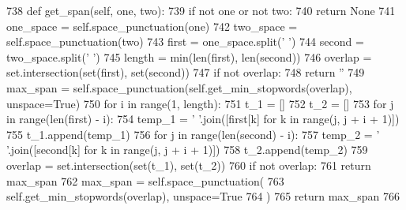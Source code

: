 \begin{DoxyCode}
738     \textcolor{keyword}{def }get\_span(self, one, two):
739         \textcolor{keywordflow}{if} \textcolor{keywordflow}{not} one \textcolor{keywordflow}{or} \textcolor{keywordflow}{not} two:
740             \textcolor{keywordflow}{return} \textcolor{keywordtype}{None}
741         one\_space = self.space\_punctuation(one)
742         two\_space = self.space\_punctuation(two)
743         first = one\_space.split(\textcolor{stringliteral}{' '})
744         second = two\_space.split(\textcolor{stringliteral}{' '})
745         length = min(len(first), len(second))
746         overlap = set.intersection(set(first), set(second))
747         \textcolor{keywordflow}{if} \textcolor{keywordflow}{not} overlap:
748             \textcolor{keywordflow}{return} \textcolor{stringliteral}{''}
749         max\_span = self.space\_punctuation(self.get\_min\_stopwords(overlap), unspace=\textcolor{keyword}{True})
750         \textcolor{keywordflow}{for} i \textcolor{keywordflow}{in} range(1, length):
751             t\_1 = []
752             t\_2 = []
753             \textcolor{keywordflow}{for} j \textcolor{keywordflow}{in} range(len(first) - i):
754                 temp\_1 = \textcolor{stringliteral}{' '}.join([first[k] \textcolor{keywordflow}{for} k \textcolor{keywordflow}{in} range(j, j + i + 1)])
755                 t\_1.append(temp\_1)
756             \textcolor{keywordflow}{for} j \textcolor{keywordflow}{in} range(len(second) - i):
757                 temp\_2 = \textcolor{stringliteral}{' '}.join([second[k] \textcolor{keywordflow}{for} k \textcolor{keywordflow}{in} range(j, j + i + 1)])
758                 t\_2.append(temp\_2)
759             overlap = set.intersection(set(t\_1), set(t\_2))
760             \textcolor{keywordflow}{if} \textcolor{keywordflow}{not} overlap:
761                 \textcolor{keywordflow}{return} max\_span
762             max\_span = self.space\_punctuation(
763                 self.get\_min\_stopwords(overlap), unspace=\textcolor{keyword}{True}
764             )
765         \textcolor{keywordflow}{return} max\_span
766 
\end{DoxyCode}
\mbox{\label{classparlai_1_1tasks_1_1wizard__of__wikipedia_1_1agents_1_1DocreaderTeacher_a0c5490abc01892bfdfe24f7efdfe97e4}} 
